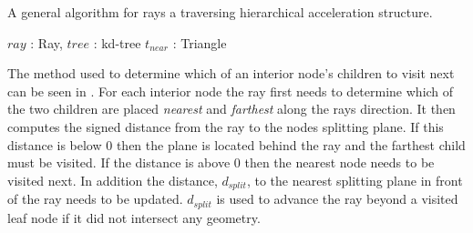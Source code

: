\begin{algorithm}
  \caption{A general algorithm for rays a traversing hierarchical acceleration
    structure.}
  \label{alg:generalTracing}
  \begin{algorithmic}
              {$ray$ : Ray, $tree$ : kd-tree}
              {$t_{near}$ : Triangle}{
                  \ELSE
                  \ENDIF
                \ENDWHILE
              }
  \end{algorithmic}
\end{algorithm}


The method used to determine which of an interior node's children to visit next
can be seen in . For each interior node the ray
first needs to determine which of the two children are placed \textit{nearest}
and \textit{farthest} along the rays direction. It then computes the signed
distance from the ray to the nodes splitting plane. If this distance is below 0
then the plane is located behind the ray and the farthest child must be
visited. If the distance is above 0 then the nearest node needs to be visited
next. In addition the distance, $d_{split}$, to the nearest splitting plane in
front of the ray needs to be updated. $d_{split}$ is used to advance the ray
beyond a visited leaf node if it did not intersect any geometry.

